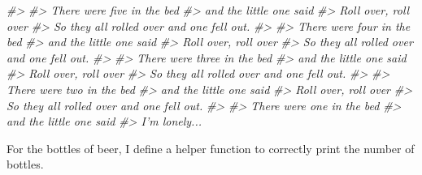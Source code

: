 \documentclass[]{book}
\newenvironment{Shaded}{\begin{snugshade}}{\end{snugshade}}
\newcommand{\CommentTok}[1]{\textcolor[rgb]{0.56,0.35,0.01}{\textit{#1}}}
\theoremstyle{plain}
\theoremstyle{remark}
\theoremstyle{definition}
\theoremstyle{definition}
\theoremstyle{definition}
\theoremstyle{remark}
\begin{document}
\begin{Shaded}
\begin{Highlighting}[]
\CommentTok{#> }
\CommentTok{#> There were five in the bed}
\CommentTok{#> and the little one said}
\CommentTok{#> Roll over, roll over}
\CommentTok{#> So they all rolled over and one fell out.}
\CommentTok{#> }
\CommentTok{#> There were four in the bed}
\CommentTok{#> and the little one said}
\CommentTok{#> Roll over, roll over}
\CommentTok{#> So they all rolled over and one fell out.}
\CommentTok{#> }
\CommentTok{#> There were three in the bed}
\CommentTok{#> and the little one said}
\CommentTok{#> Roll over, roll over}
\CommentTok{#> So they all rolled over and one fell out.}
\CommentTok{#> }
\CommentTok{#> There were two in the bed}
\CommentTok{#> and the little one said}
\CommentTok{#> Roll over, roll over}
\CommentTok{#> So they all rolled over and one fell out.}
\CommentTok{#> }
\CommentTok{#> There were one in the bed}
\CommentTok{#> and the little one said}
\CommentTok{#> I'm lonely...}
\end{Highlighting}
\end{Shaded}

For the bottles of beer, I define a helper function to correctly print
the number of bottles.
\end{document}
